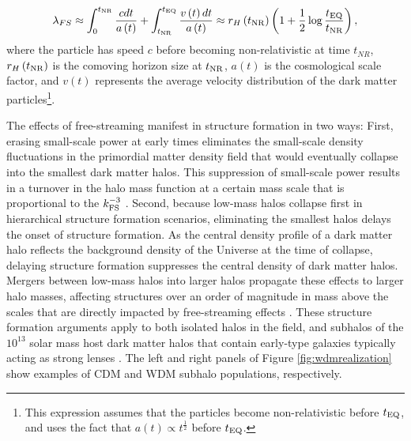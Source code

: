 \begin{equation}
\label{eqn:freestreaming}
\lambda_{FS} \approx \int_{0}^{t_{\rm{NR}}} \frac{c dt}{a\left(t\right)} +  \int_{t_{\rm{NR}}}^{t_{\rm{EQ}}} \frac{v\left(t\right) dt}{a\left(t\right)} \approx r_{H}\left(t_{\rm{NR}}\right) \left(1 +\frac{1}{2} \log \frac{t_{\rm{EQ}}}{t_{\rm{NR}}} \right),
\end{equation}
where the particle has speed $c$ before becoming non-relativistic at time $t_{NR}$, $r_H \left(t_{\rm{NR}}\right)$ is the comoving horizon size at $t_{\rm{NR}}$, $a\left(t\right)$ is the cosmological scale factor, and $v\left(t\right)$ represents the average velocity distribution of the dark matter particles\footnote{This expression assumes that the particles become non-relativistic before $t_{\rm{EQ}}$, and uses the fact that $a\left(t\right)\propto t^{\frac{1}{2}}$ before $t_{\rm{EQ}}$.}. 

The effects of free-streaming manifest in structure formation in two ways: First, erasing small-scale power at early times eliminates the small-scale density fluctuations in the primordial matter density field that would eventually collapse into the smallest dark matter halos. This suppression of small-scale power results in a turnover in the halo mass function at a certain mass scale that is proportional to the $k_{\rm{FS}}^{-3}$ \citep{AvilaReese++01,Schneider++12,Lovell++14}. Second, because low-mass halos collapse first in hierarchical structure formation scenarios, eliminating the smallest halos delays the onset of structure formation. As the central density profile of a dark matter halo reflects the background density of the Universe at the time of collapse, delaying structure formation suppresses the central density of dark matter halos. Mergers between low-mass halos into larger halos propagate these effects to larger halo masses, affecting structures over an order of magnitude in mass above the scales that are directly impacted by free-streaming effects \citep{Navarro++96,Bose++16}. These structure formation arguments apply to both isolated halos in the field, and subhalos of the $10^{13}$ solar mass host dark matter halos that contain early-type galaxies typically acting as strong lenses \citep{Gavazzi++07}. The left and right panels of Figure \ref{fig:wdmrealization} show examples of CDM and WDM subhalo populations, respectively. 

